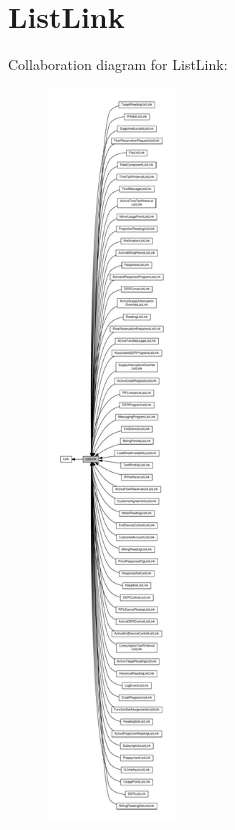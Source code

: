\hypertarget{group__ListLink}{}\section{List\+Link}
\label{group__ListLink}
Collaboration diagram for List\+Link\+:\nopagebreak
\begin{figure}[H]
\begin{center}
\leavevmode
\includegraphics[height=550pt]{group__ListLink}
\end{center}
\end{figure}
